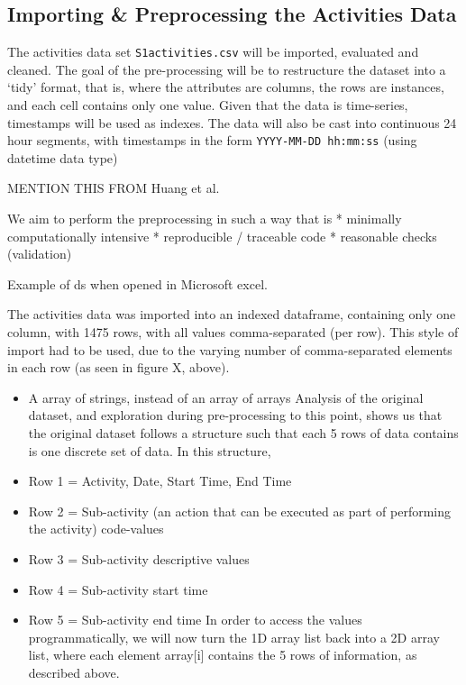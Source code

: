 \documentclass[11pt]{article}
\providecommand{\tightlist}{%
      \setlength{\itemsep}{0pt}\setlength{\parskip}{0pt}}
\begin{document}
    \hypertarget{importing-preprocessing-the-activities-data}{%
\subsection{Importing \& Preprocessing the Activities
Data}\label{importing-preprocessing-the-activities-data}}

    The activities data set \texttt{S1activities.csv} will be imported,
evaluated and cleaned. The goal of the pre-processing will be to
restructure the dataset into a `tidy' format, that is, where the
attributes are columns, the rows are instances, and each cell contains
only one value. Given that the data is time-series, timestamps will be
used as indexes. The data will also be cast into continuous 24 hour
segments, with timestamps in the form \texttt{YYYY-MM-DD\ hh:mm:ss}
(using datetime data type)

MENTION THIS FROM Huang et al.~

We aim to perform the preprocessing in such a way that is * minimally
computationally intensive * reproducible / traceable code * reasonable
checks (validation)

Example of ds when opened in Microsoft excel.

The activities data was imported into an indexed dataframe, containing
only one column, with 1475 rows, with all values comma-separated (per
row). This style of import had to be used, due to the varying number of
comma-separated elements in each row (as seen in figure X, above).

\begin{itemize}
\tightlist
\item
  A array of strings, instead of an array of arrays Analysis of the
  original dataset, and exploration during pre-processing to this point,
  shows us that the original dataset follows a structure such that each
  5 rows of data contains is one discrete set of data. In this
  structure,
\item
  Row 1 = Activity, Date, Start Time, End Time
\item
  Row 2 = Sub-activity (an action that can be executed as part of
  performing the activity) code-values
\item
  Row 3 = Sub-activity descriptive values
\item
  Row 4 = Sub-activity start time
\item
  Row 5 = Sub-activity end time In order to access the values
  programmatically, we will now turn the 1D array list back into a 2D
  array list, where each element array{[}i{]} contains the 5 rows of
  information, as described above.
\end{itemize}
\end{document}

